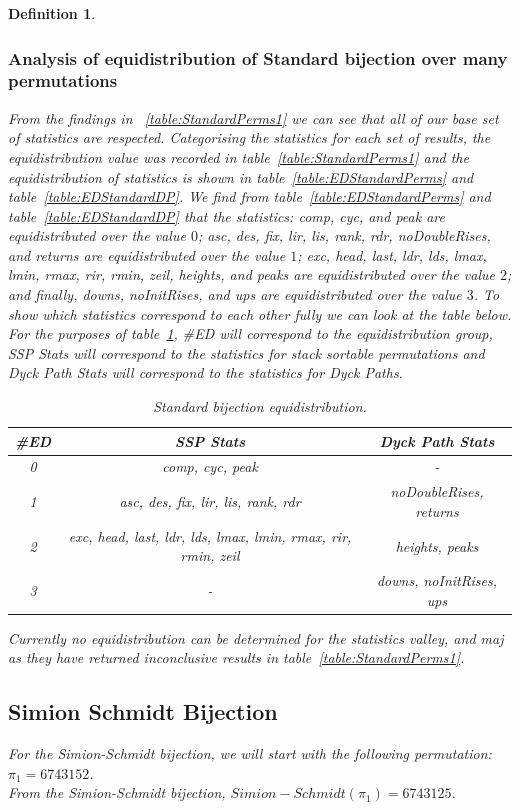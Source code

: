 \documentclass[12pt]{article}
\newtheorem{definition}{Definition}
\begin{document}
\begin{definition}
\subsubsection{Analysis of equidistribution of Standard bijection over many permutations}
From the findings in ~\ref{table:StandardPerms1} we can see that all of our base set of statistics are respected. Categorising the statistics for each set of results, the equidistribution value was recorded in table~\ref{table:StandardPerms1} and the equidistribution of statistics is shown in table~\ref{table:EDStandardPerms} and table~\ref{table:EDStandardDP}. We find from table~\ref{table:EDStandardPerms} and table~\ref{table:EDStandardDP} that the statistics: comp, cyc, and peak are equidistributed over the value $0$; asc, des, fix, lir, lis, rank, rdr, noDoubleRises, and returns are equidistributed over the value $1$; exc, head, last, ldr, lds, lmax, lmin, rmax, rir, rmin, zeil, heights, and peaks are equidistributed over the value $2$; and finally, downs, noInitRises, and ups are equidistributed over the value $3$. To show which statistics correspond to each other fully we can look at the table below. For the purposes of table~\ref{table:FinalEDStandard}, \#ED will correspond to the equidistribution group, SSP Stats will correspond to the statistics for stack sortable permutations and Dyck Path Stats will correspond to the statistics for Dyck Paths.
\begin{table}[H]
\caption{Standard bijection equidistribution.}
\begin{tabular}{c | c | c}
\hline\hline
\#ED & SSP Stats & Dyck Path Stats\\ [0.5ex]
\hline
0 & comp, cyc, peak & - \\
\hline
1 & asc, des, fix, lir, lis, rank, rdr & noDoubleRises, returns \\
\hline
2 & exc, head, last, ldr, lds, lmax, lmin, rmax, rir, rmin, zeil & heights, peaks \\
\hline
3 & - & downs, noInitRises, ups\\
\hline
\end{tabular}
\label{table:FinalEDStandard}
\end{table}
Currently no equidistribution can be determined for the statistics valley, and maj as they have returned inconclusive results in table~\ref{table:StandardPerms1}.

\subsection{Simion Schmidt Bijection}
For the Simion-Schmidt bijection, we will start with the following permutation: $\pi_1 = 6743152$.\\
From the Simion-Schmidt bijection, $Simion-Schmidt(\pi_1) = 6743125$.\\

\end{definition}
\end{document}
